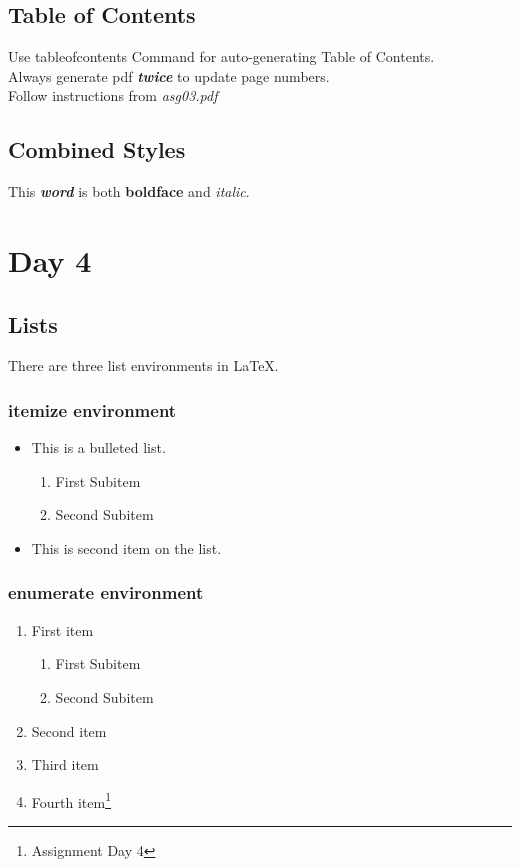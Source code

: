 \documentclass[a4paper,12pt]{article}
\begin{document}
\subsection{Table of Contents}
Use tableofcontents Command for auto-generating Table of Contents.\\
Always generate pdf \textbf{\textit{twice}} to update page numbers.\\
Follow instructions from \textit{asg03.pdf}

\subsection*{Combined Styles}
This \textbf{\textit{word}} is both \textbf{boldface} and \textit{italic}.

\section{Day 4}

\subsection{Lists}
There are three list environments in LaTeX.
\subsubsection*{itemize environment}
	\begin{itemize}[label=\S]
		\item This is a bulleted list.
			\begin{enumerate}
				\item First Subitem
				\item Second Subitem
			\end{enumerate}
		\item This is second item on the list.
	\end{itemize}

\subsubsection*{enumerate environment}
	\begin{enumerate}
		\item First item
			\begin{enumerate}[label=\roman*]
				\item First Subitem
				\item Second Subitem
			\end{enumerate}
		\item Second item
		\item Third item
		\item Fourth item\footnote{Assignment Day 4}
	\end{enumerate}
\end{document}
